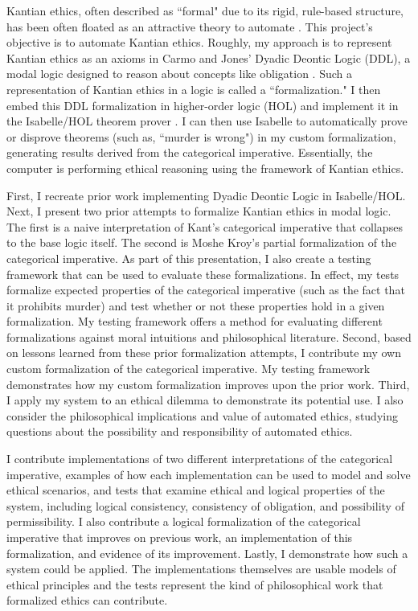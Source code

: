 \begin{isabellebody}
\begin{isamarkuptext}
Kantian ethics, often described as ``formal" due to its rigid, rule-based structure, has been often 
floated as an attractive theory to automate \cite{powers, BL, lin}. This project's objective is to 
automate Kantian ethics. Roughly, my approach is to represent Kantian
ethics as an axioms in Carmo and Jones' Dyadic Deontic Logic (DDL), a modal logic designed to reason
about concepts like obligation \cite{CJDDL}. Such a representation of Kantian ethics in a logic
is called a ``formalization." I then embed this DDL formalization in higher-order logic 
(HOL) and implement it in the Isabelle/HOL theorem prover  \cite{isabelle}. I can then use Isabelle 
to automatically prove or disprove theorems (such as, ``murder is wrong") in my custom formalization, generating results
derived from the categorical imperative. Essentially, the computer is performing ethical reasoning using
the framework of Kantian ethics.

First, I recreate prior work implementing Dyadic Deontic Logic in Isabelle/HOL. Next, I present two 
prior attempts to formalize Kantian ethics in modal logic. The first is a naive
interpretation of Kant's categorical imperative that collapses to the base logic itself. The second is 
Moshe Kroy's partial formalization of the categorical imperative. As part of this presentation, I also
create a testing framework that can be used to evaluate these formalizations. In effect, my tests formalize
expected properties of the categorical imperative (such as the fact that it prohibits murder) and test 
whether or not these properties hold in a given formalization. My testing framework offers a method for
evaluating different formalizations against moral intuitions and philosophical literature. Second, based on
lessons learned from these prior formalization attempts, I contribute my own custom formalization of
the categorical imperative. My testing framework demonstrates how my custom formalization improves upon
the prior work. Third, I apply my system to an ethical dilemma to demonstrate its potential use. I also
consider the philosophical implications and value of automated ethics, studying questions about the 
possibility and responsibility of automated ethics.

I contribute implementations of two different interpretations of the categorical imperative, 
examples of how each implementation can be used to model and solve ethical scenarios, and tests that
examine ethical and logical properties of the system, including logical consistency, consistency
of obligation, and possibility of permissibility. I also contribute a logical formalization of the categorical
imperative that improves on previous work, an implementation of this formalization, and evidence of 
its improvement. Lastly, I demonstrate how such a system could be applied. The implementations themselves are usable models 
of ethical principles and the tests represent the kind of philosophical work that formalized ethics 
can contribute.


\end{isamarkuptext}
\end{isabellebody}
